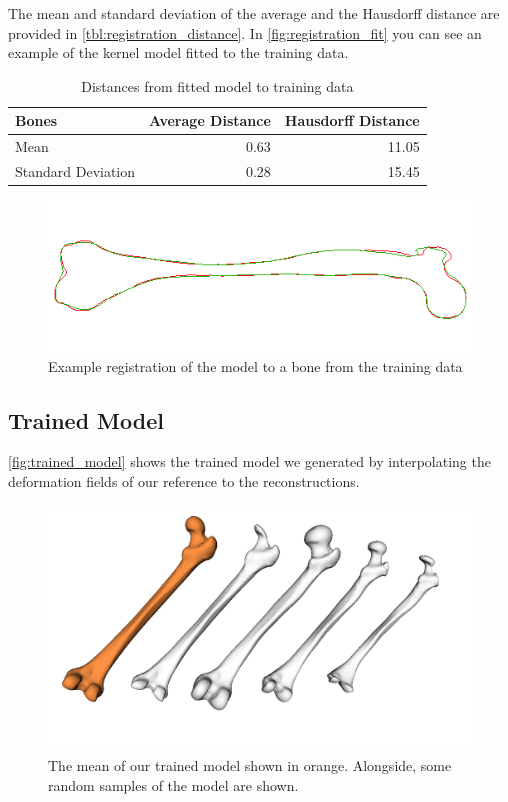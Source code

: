 The mean and standard deviation of the average and the Hausdorff distance are provided in \autoref{tbl:registration_distance}.
In \autoref{fig:registration_fit} you can see an example of the kernel model fitted to the training data.

\begin{table}
  \centering
  \caption{Distances from fitted model to training data}
  \label{tbl:registration_distance}
  \begin{tabular}{lrr}
    \toprule
      \textbf{Bones} &
      Average Distance &
      Hausdorff Distance \\
    \midrule
      Mean& 0.63 & 11.05 \\
      Standard Deviation& 0.28 & 15.45 \\
    \bottomrule
  \end{tabular}
\end{table}

\begin{figure}
	\centering
  \includegraphics[scale=0.7]{./Figures/registration_fit}
  \caption{Example registration of the model to a bone from the training data}
  \label{fig:registration_fit}
\end{figure}


\subsection{Trained Model}
\label{subsec:trainedmodel}
\autoref{fig:trained_model} shows the trained model we generated by interpolating the deformation fields of our reference to the reconstructions.

\begin{figure}
	\centering
  \includegraphics[width=\columnwidth]{./Figures/interpolated_model_samples}
  \caption{
    The mean of our trained model shown in orange.
    Alongside, some random samples of the model are shown.}
  \label{fig:trained_model}
\end{figure}

